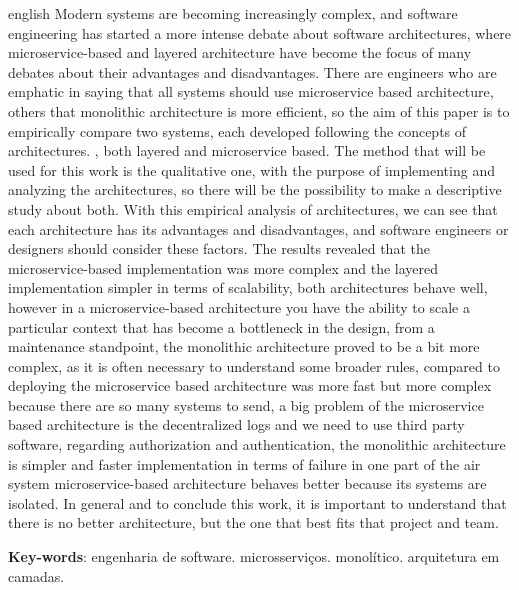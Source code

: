 \documentclass[12pt,oneside,a4paper,english,french,spanish,brazil]{abntex2}
\begin{document}
\begin{resumo}[Abstract]
 \begin{otherlanguage*}{english}
  Modern systems are becoming increasingly complex, and software engineering has started a more intense debate about software architectures, where microservice-based and layered architecture have become the focus of many debates about their advantages and disadvantages. There are engineers who are emphatic in saying that all systems should use microservice based architecture, others that monolithic architecture is more efficient, so the aim of this paper is to empirically compare two systems, each developed following the concepts of architectures. , both layered and microservice based. The method that will be used for this work is the qualitative one, with the purpose of implementing and analyzing the architectures, so there will be the possibility to make a descriptive study about both. With this empirical analysis of architectures, we can see that each architecture has its advantages and disadvantages, and software engineers or designers should consider these factors. The results revealed that the microservice-based implementation was more complex and the layered implementation simpler in terms of scalability, both architectures behave well, however in a microservice-based architecture you have the ability to scale a particular context that has become a bottleneck in the design, from a maintenance standpoint, the monolithic architecture proved to be a bit more complex, as it is often necessary to understand some broader rules, compared to deploying the microservice based architecture was more fast but more complex because there are so many systems to send, a big problem of the microservice based architecture is the decentralized logs and we need to use third party software, regarding authorization and authentication, the monolithic architecture is simpler and faster implementation in terms of failure in one part of the air system microservice-based architecture behaves better because its systems are isolated. In general and to conclude this work, it is important to understand that there is no better architecture, but the one that best fits that project and team.

  \vspace{\onelineskip}

  \noindent
  \textbf{Key-words}: engenharia de software. microsserviços. monolítico. arquitetura em camadas.
 \end{otherlanguage*}
\end{resumo}
\end{document}
